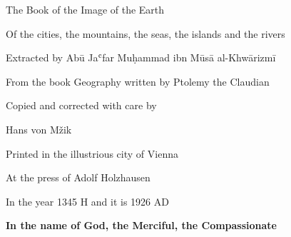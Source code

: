 \documentclass[11pt]{article}
\newcommand{\Pg}[1]{\marginpar{\footnotesize #1}}
\begin{document}
\begin{center}\large The Book of the Image of the Earth\end{center}

\begin{center}\large Of the cities, the mountains, the seas, the islands and the rivers\end{center}

\begin{center}\large Extracted by Abū Jaʿfar Muḥammad ibn Mūsā al-Khwārizmī\end{center}

\begin{center}\large From the book Geography written by Ptolemy the Claudian\end{center}

\begin{center}\large Copied and corrected with care by\end{center}

\begin{center}\large Hans von Mžik\end{center}

\begin{center}\large Printed in the illustrious city of Vienna\end{center}

\begin{center}\large At the press of Adolf Holzhausen\end{center}

\begin{center}\large In the year 1345 H and it is 1926 AD\end{center}

\par\medskip\begin{center}\Pg{p. 3}\bfseries In the name of God, the Merciful, the Compassionate\end{center}\par

\par{}\par
\end{document}
